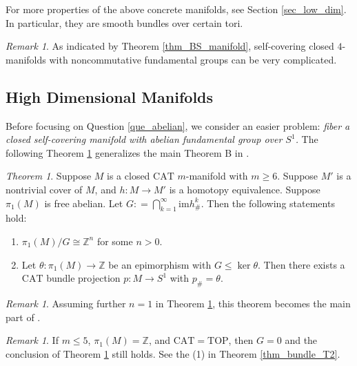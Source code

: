 \documentclass[12pt]{amsart}
\theoremstyle{plain}
\theoremstyle{definition}
\theoremstyle{question}
\theoremstyle{remark}
\newtheorem{remark}[theorem]{Remark}
\theoremstyle{assumption}
\numberwithin{equation}{section}
\theoremstyle{bigthm}
\newtheorem{bigthm}{Theorem}
\begin{document}
For more properties of the above concrete manifolds, see Section \ref{sec_low_dim}. In particular, they are smooth bundles over certain tori.
\begin{remark}
As indicated by Theorem \ref{thm_BS_manifold}, self-covering closed $4$-manifolds with noncommutative fundamental groups can be very complicated.
\end{remark}

\subsection{High Dimensional Manifolds}\label{subsec_high}
Before focusing on Question \ref{que_abelian}, we consider an easier problem: \textit{fiber a closed self-covering manifold with abelian fundamental group over $S^{1}$.} The following Theorem \ref{thm_bundle_s1} generalizes the main Theorem B in \cite{Qin_Su_Wang}.

\begin{bigthm}\label{thm_bundle_s1}
Suppose $M$ is a closed $\mathrm{CAT}$ $m$-manifold with $m \ge 6$. Suppose $M'$ is a nontrivial cover of $M$, and $h \colon  M \rightarrow M'$ is a homotopy equivalence. Suppose $\pi_{1} (M)$ is free abelian. Let $G: = \bigcap_{k=1}^{\infty} \mathrm{im} h_{\#}^{k}$. Then the following statements hold:
\begin{enumerate}
\item $\pi_{1} (M) /G \cong \mathbb{Z}^{n}$ for some $n >0$.

\item Let $\theta \colon  \pi_{1} (M) \rightarrow \mathbb{Z}$ be an epimorphism with $G \le \ker \theta$. Then there exists a $\mathrm{CAT}$ bundle projection $p \colon  M \rightarrow S^{1}$ with $p_{\#} = \theta$.
\end{enumerate}
\end{bigthm}

\begin{remark}
Assuming further $n=1$ in Theorem \ref{thm_bundle_s1}, this theorem becomes the main part of \cite[Theorem~B]{Qin_Su_Wang}.
\end{remark}

\begin{remark}
If $m \le 5$, $\pi_{1} (M) = \mathbb{Z}$, and $\mathrm{CAT} = \mathrm{TOP}$, then $G=0$ and the conclusion of Theorem \ref{thm_bundle_s1} still holds. See the (1) in Theorem \ref{thm_bundle_T2}.
\end{remark}
\end{document}
